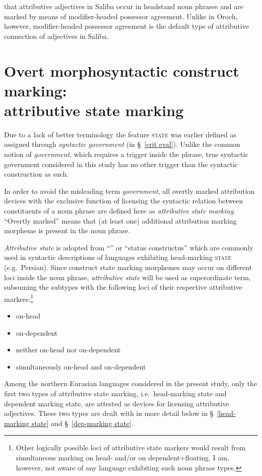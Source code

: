  that attributive adjectives in Saliba occur in headstand noun phrases and are marked by means of modifier\hyp{}headed possessor agreement. Unlike in Oroch, however, modifier\hyp{}headed possessor agreement is the default type of attributive connection of adjectives in Saliba.

\section[Attributive state marking]{Overt morphosyntactic construct marking:\\attributive state marking}

Due to a lack of better terminology the feature \textsc{state} was earlier defined as assigned through \emph{syntactic government} (in \S~\ref{crit eval}). Unlike the common notion of \emph{government}, which requires a trigger inside the phrase, true syntactic government considered in this study has no other trigger than the syntactic construction as such.

In order to avoid the misleading term \emph{government}, all overtly marked attribution devices with the exclusive function of licensing the syntactic relation between constituents of a noun phrase are defined here as \emph{attributive state marking}. “Overtly marked” means that (at least one) additional attribution marking morpheme is present in the noun phrase.

\emph{Attributive state} is adopted from “” or “status constructus” which are commonly used in syntactic descriptions of languages exhibiting head-marking \textsc{state} (e.g.~Persian). Since construct state marking morphemes may occur on different loci inside the noun phrase, \emph{attributive state} will be used as superordinate term, subsuming the subtypes with the following loci of their respective attributive markers:\footnote{Other logically possible loci of attributive state markers would result from simultaneous marking on head- and\slash{}or on dependent+floating. I am, however, not aware of any language exhibiting such noun phrase types.}
\begin{itemize}
\settowidth{}
\item on-head 
\item on-dependent 
\item neither on-head nor on-dependent 
\item simultaneously on-head and on-dependent 
\end{itemize}
Among the northern Eurasian languages considered in the present study, only the first two types of attributive state marking, i.e.~head-marking state and dependent marking state, are attested as devices for licensing attributive adjectives. These two types are dealt with in more detail below in \S~\ref{head-marking state} and \S~\ref{dep-marking state}.

